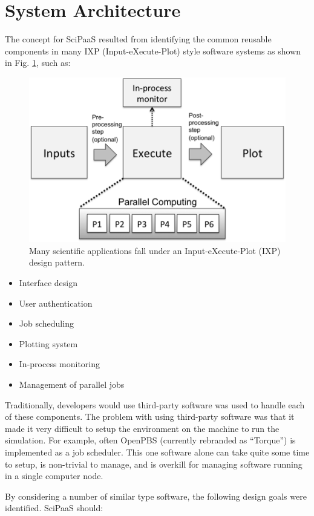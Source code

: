 \documentclass[10pt,reprint]{socc14}
\begin{document}
\section{System Architecture}

The concept for SciPaaS resulted from identifying the common reusable components in many IXP (Input-eXecute-Plot) style software systems as shown in Fig. \ref{ixp}, such as:

\begin{figure}[t]
\centering
\includegraphics[natwidth=450,natheight=289]{figs/ixp.png}
\caption{Many scientific applications fall under an Input-eXecute-Plot (IXP) design pattern. \label{ixp}}
\end{figure}

\begin{itemize}
\item Interface design
\item User authentication
\item Job scheduling
\item Plotting system
\item In-process monitoring
\item Management of parallel jobs
\end{itemize}

Traditionally, developers would use third-party software was used to handle each of these components.  The problem with using third-party software was that it made it very difficult to setup the environment on the machine to run the simulation.  For example, often OpenPBS (currently rebranded as “Torque”) is implemented as a job scheduler.  This one software alone can take quite some time to setup, is non-trivial to manage, and is overkill for managing software running in a single computer node.

By considering a number of similar type software, the following design goals were identified.  SciPaaS should:
\end{document}
